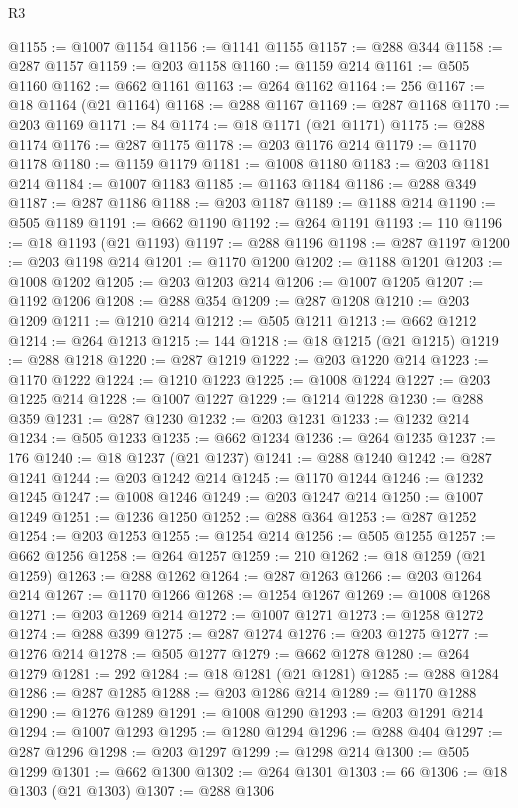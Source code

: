 \begin{lexlean}{R3}
\begin{coremodule}
@1155 := @1007 @1154
@1156 := @1141 @1155
@1157 := @288 @344
@1158 := @287 @1157
@1159 := @203 @1158
@1160 := @1159 @214
@1161 := @505 @1160
@1162 := @662 @1161
@1163 := @264 @1162
@1164 := 256
@1167 := @18 @1164 (@21 @1164)
@1168 := @288 @1167
@1169 := @287 @1168
@1170 := @203 @1169
@1171 := 84
@1174 := @18 @1171 (@21 @1171)
@1175 := @288 @1174
@1176 := @287 @1175
@1178 := @203 @1176 @214
@1179 := @1170 @1178
@1180 := @1159 @1179
@1181 := @1008 @1180
@1183 := @203 @1181 @214
@1184 := @1007 @1183
@1185 := @1163 @1184
@1186 := @288 @349
@1187 := @287 @1186
@1188 := @203 @1187
@1189 := @1188 @214
@1190 := @505 @1189
@1191 := @662 @1190
@1192 := @264 @1191
@1193 := 110
@1196 := @18 @1193 (@21 @1193)
@1197 := @288 @1196
@1198 := @287 @1197
@1200 := @203 @1198 @214
@1201 := @1170 @1200
@1202 := @1188 @1201
@1203 := @1008 @1202
@1205 := @203 @1203 @214
@1206 := @1007 @1205
@1207 := @1192 @1206
@1208 := @288 @354
@1209 := @287 @1208
@1210 := @203 @1209
@1211 := @1210 @214
@1212 := @505 @1211
@1213 := @662 @1212
@1214 := @264 @1213
@1215 := 144
@1218 := @18 @1215 (@21 @1215)
@1219 := @288 @1218
@1220 := @287 @1219
@1222 := @203 @1220 @214
@1223 := @1170 @1222
@1224 := @1210 @1223
@1225 := @1008 @1224
@1227 := @203 @1225 @214
@1228 := @1007 @1227
@1229 := @1214 @1228
@1230 := @288 @359
@1231 := @287 @1230
@1232 := @203 @1231
@1233 := @1232 @214
@1234 := @505 @1233
@1235 := @662 @1234
@1236 := @264 @1235
@1237 := 176
@1240 := @18 @1237 (@21 @1237)
@1241 := @288 @1240
@1242 := @287 @1241
@1244 := @203 @1242 @214
@1245 := @1170 @1244
@1246 := @1232 @1245
@1247 := @1008 @1246
@1249 := @203 @1247 @214
@1250 := @1007 @1249
@1251 := @1236 @1250
@1252 := @288 @364
@1253 := @287 @1252
@1254 := @203 @1253
@1255 := @1254 @214
@1256 := @505 @1255
@1257 := @662 @1256
@1258 := @264 @1257
@1259 := 210
@1262 := @18 @1259 (@21 @1259)
@1263 := @288 @1262
@1264 := @287 @1263
@1266 := @203 @1264 @214
@1267 := @1170 @1266
@1268 := @1254 @1267
@1269 := @1008 @1268
@1271 := @203 @1269 @214
@1272 := @1007 @1271
@1273 := @1258 @1272
@1274 := @288 @399
@1275 := @287 @1274
@1276 := @203 @1275
@1277 := @1276 @214
@1278 := @505 @1277
@1279 := @662 @1278
@1280 := @264 @1279
@1281 := 292
@1284 := @18 @1281 (@21 @1281)
@1285 := @288 @1284
@1286 := @287 @1285
@1288 := @203 @1286 @214
@1289 := @1170 @1288
@1290 := @1276 @1289
@1291 := @1008 @1290
@1293 := @203 @1291 @214
@1294 := @1007 @1293
@1295 := @1280 @1294
@1296 := @288 @404
@1297 := @287 @1296
@1298 := @203 @1297
@1299 := @1298 @214
@1300 := @505 @1299
@1301 := @662 @1300
@1302 := @264 @1301
@1303 := 66
@1306 := @18 @1303 (@21 @1303)
@1307 := @288 @1306

\end{coremodule}
\end{lexlean}
